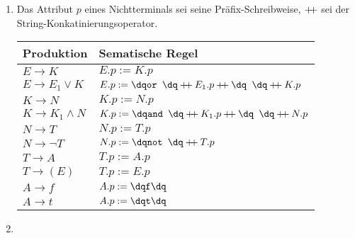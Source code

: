 \documentclass[a4paper,10pt]{scrartcl}
\begin{document}
\section{}
\begin{enumerate}
 \item  Das Attribut $p$ eines Nichtterminals sei seine Präfix-Schreibweise, $\mathbin{+\mkern-5mu+}$ sei der String-Konkatinierungsoperator.
        \begin{center}
            \begin{tabular}{l|l}
                \textbf{Produktion} & \textbf{Sematische Regel} \\\hline
                $E \to K$                       & $E.p := K.p$ \\
                $E \to E_1 \lor K$              & $E.p := \str{or } \concat E_1.p \concat \str{ } \concat K.p$ \\
                $K \to N$                       & $K.p := N.p$ \\
                $K \to K_1 \land N$             & $K.p := \str{and } \concat K_1.p \concat \str{ } \concat N.p$\\
                $N \to T$                       & $N.p := T.p$\\
                $N \to \neg T$                  & $N.p := \str{not } \concat T.p$\\
                $T \to A$                       & $T.p := A.p$\\
                $T \to (E)$                     & $T.p := E.p$\\
                $A \to f$                       & $A.p := \str{f}$\\
                $A \to t$                       & $A.p := \str{t}$\\
            \end{tabular}
        \end{center}
 \item  \hspace{0cm}\\
        \begin{center}
\end{center}
\end{enumerate}
\end{document}
